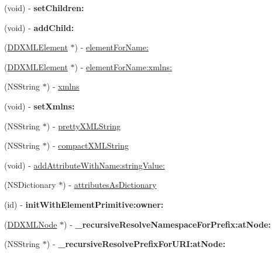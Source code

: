 \begin{DoxyCompactItemize}
\item 
\hypertarget{interface_d_d_x_m_l_element_a062a449f5da08a47db3690bfeb3bd600}{}(void) -\/ {\bfseries set\+Children\+:}\label{interface_d_d_x_m_l_element_a062a449f5da08a47db3690bfeb3bd600}

\item 
\hypertarget{interface_d_d_x_m_l_element_ae2afeb2dd57de15872df0fb64c594f70}{}(void) -\/ {\bfseries add\+Child\+:}\label{interface_d_d_x_m_l_element_ae2afeb2dd57de15872df0fb64c594f70}

\item 
(\hyperlink{interface_d_d_x_m_l_element}{D\+D\+X\+M\+L\+Element} $\ast$) -\/ \hyperlink{interface_d_d_x_m_l_element_af62ac4ff2395956f1dd305efadf4c66c}{element\+For\+Name\+:}
\item 
(\hyperlink{interface_d_d_x_m_l_element}{D\+D\+X\+M\+L\+Element} $\ast$) -\/ \hyperlink{interface_d_d_x_m_l_element_a830d664d62774d3c6c63ba52bf9634ce}{element\+For\+Name\+:xmlns\+:}
\item 
(N\+S\+String $\ast$) -\/ \hyperlink{interface_d_d_x_m_l_element_a4d039c6cbaafa1dfcb64d83b362036ad}{xmlns}
\item 
\hypertarget{interface_d_d_x_m_l_element_a8652f5d90a5f99028d7af6967b198476}{}(void) -\/ {\bfseries set\+Xmlns\+:}\label{interface_d_d_x_m_l_element_a8652f5d90a5f99028d7af6967b198476}

\item 
(N\+S\+String $\ast$) -\/ \hyperlink{interface_d_d_x_m_l_element_ac0ac8be82bbe1d6d7bba84bc8f72a8d4}{pretty\+X\+M\+L\+String}
\item 
(N\+S\+String $\ast$) -\/ \hyperlink{interface_d_d_x_m_l_element_a3a9859998e5c70118de78b535595249e}{compact\+X\+M\+L\+String}
\item 
(void) -\/ \hyperlink{interface_d_d_x_m_l_element_a4633a5b7adc0664bd8bc695ff07cf85f}{add\+Attribute\+With\+Name\+:string\+Value\+:}
\item 
(N\+S\+Dictionary $\ast$) -\/ \hyperlink{interface_d_d_x_m_l_element_a6d7166bb73bc22b99605d756994562fe}{attributes\+As\+Dictionary}
\item 
\hypertarget{interface_d_d_x_m_l_element_abd3c0834b718aa0e99838c7d28d8c42e}{}(id) -\/ {\bfseries init\+With\+Element\+Primitive\+:owner\+:}\label{interface_d_d_x_m_l_element_abd3c0834b718aa0e99838c7d28d8c42e}

\item 
\hypertarget{interface_d_d_x_m_l_element_aca3c25f8aff56d53947db2deae0b5615}{}(\hyperlink{interface_d_d_x_m_l_node}{D\+D\+X\+M\+L\+Node} $\ast$) -\/ {\bfseries \+\_\+recursive\+Resolve\+Namespace\+For\+Prefix\+:at\+Node\+:}\label{interface_d_d_x_m_l_element_aca3c25f8aff56d53947db2deae0b5615}

\item 
\hypertarget{interface_d_d_x_m_l_element_a7b1bf34f89e613e29433cdc22b077753}{}(N\+S\+String $\ast$) -\/ {\bfseries \+\_\+recursive\+Resolve\+Prefix\+For\+U\+R\+I\+:at\+Node\+:}\label{interface_d_d_x_m_l_element_a7b1bf34f89e613e29433cdc22b077753}

\end{DoxyCompactItemize}
